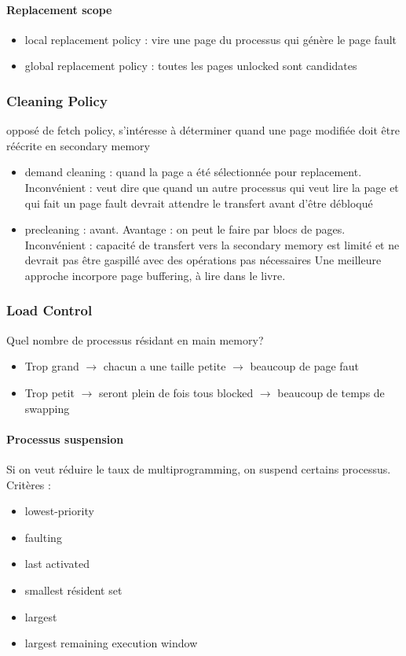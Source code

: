 \paragraph{Replacement scope}
\begin{itemize}
\item local replacement policy : vire une page du processus qui génère le page fault
\item global replacement policy : toutes les pages unlocked sont candidates
\end{itemize}
\subsubsection{Cleaning Policy}
opposé de fetch policy, s'intéresse à déterminer quand une page modifiée doit être réécrite en secondary memory
\begin{itemize}
\item demand cleaning : quand la page a été sélectionnée pour replacement.
Inconvénient : veut dire que quand un autre processus qui veut lire la page et qui fait un page fault devrait attendre le transfert avant d'être débloqué
\item precleaning : avant.
Avantage : on peut le faire par blocs de pages.
Inconvénient : capacité de transfert vers la secondary memory est limité et ne devrait pas être gaspillé avec des opérations pas nécessaires
Une meilleure approche incorpore page buffering, à lire dans le livre.
\end{itemize}
\subsubsection{Load Control}
Quel nombre de processus résidant en main memory?
\begin{itemize}
\item Trop grand $\rightarrow$ chacun a une taille petite $\rightarrow$ beaucoup de page faut
\item Trop petit $\rightarrow$ seront plein de fois tous blocked  $\rightarrow$ beaucoup de temps de swapping
\end{itemize}
\paragraph{Processus suspension} Si on veut réduire le taux de multiprogramming, on suspend certains processus.
Critères :
\begin{itemize}
\item lowest-priority
\item faulting
\item last activated
\item smallest résident set
\item largest
\item largest remaining execution window
\end{itemize}

